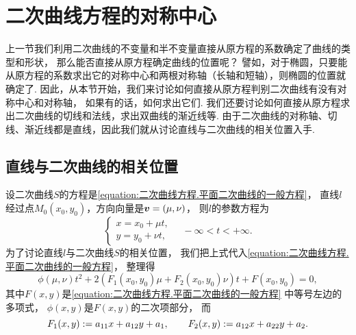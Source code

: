 \section{二次曲线方程的对称中心}
上一节我们利用二次曲线的不变量和半不变量直接从原方程的系数确定了曲线的类型和形状，
那么能否直接从原方程确定曲线的位置呢？
譬如，对于椭圆，只要能从原方程的系数求出它的对称中心和两根对称轴（长轴和短轴），则椭圆的位置就确定了.
因此，从本节开始，我们来讨论如何直接从原方程判别二次曲线有没有对称中心和对称轴，
如果有的话，如何求出它们.
我们还要讨论如何直接从原方程求出二次曲线的切线和法线，求出双曲线的渐近线等.
由于二次曲线的对称轴、切线、渐近线都是直线，因此我们就从讨论直线与二次曲线的相关位置入手.

\subsection{直线与二次曲线的相关位置}
设二次曲线\(S\)的方程是\cref{equation:二次曲线方程.平面二次曲线的一般方程}，
直线\(l\)经过点\(M_0(x_0,y_0)\)，方向向量是\(\boldsymbol{v} = (\mu,\nu)\)，
则\(l\)的参数方程为\begin{equation*}
	\left\{ \begin{array}{l}
		x = x_0 + \mu t, \\
		y = y_0 + \nu t,
	\end{array} \right.
	\quad -\infty < t < +\infty.
\end{equation*}
为了讨论直线\(l\)与二次曲线\(S\)的相关位置，
我们把上式代入\cref{equation:二次曲线方程.平面二次曲线的一般方程}，
整理得\begin{equation}\label{equation:二次曲线方程的对称中心.在曲线方程中代入直线方程}
	\phi(\mu,\nu) t^2
	+ 2 (
		F_1(x_0,y_0) \mu
		+ F_2(x_0,y_0) \nu
	) t
	+ F(x_0,y_0)
	= 0,
\end{equation}
其中\(F(x,y)\)是\cref{equation:二次曲线方程.平面二次曲线的一般方程} 中等号左边的多项式，
\(\phi(x,y)\)是\(F(x,y)\)的二次项部分，
而\begin{equation*}
	F_1(x,y) := a_{11} x + a_{12} y + a_1,
	\qquad
	F_2(x,y) := a_{12} x + a_{22} y + a_2.
\end{equation*}

